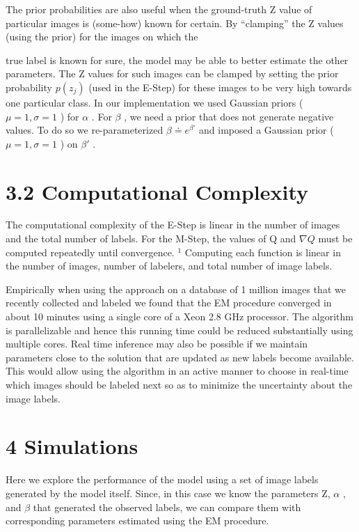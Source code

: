 \documentclass[
]{article}
\begin{document}
The prior probabilities are also useful when the ground-truth Z value of
particular images is (some-how) known for certain. By ``clamping'' the Z
values (using the prior) for the images on which the

true label is known for sure, the model may be able to better estimate
the other parameters. The Z values for such images can be clamped by
setting the prior probability \(p(z_{j})\) (used in the E-Step) for
these images to be very high towards one particular class. In our
implementation we used Gaussian priors ( \(\mu = 1, \sigma = 1\) ) for
\(\alpha\) . For \(\beta\) , we need a prior that does not generate
negative values. To do so we re-parameterized
\(\beta \doteq e^{\beta'}\) and imposed a Gaussian prior (
\(\mu = 1, \sigma = 1\) ) on \(\beta'\) .

\section{3.2 Computational Complexity}\label{computational-complexity}

The computational complexity of the E-Step is linear in the number of
images and the total number of labels. For the M-Step, the values of Q
and \(\nabla Q\) must be computed repeatedly until convergence. \(^{1}\)
Computing each function is linear in the number of images, number of
labelers, and total number of image labels.

Empirically when using the approach on a database of 1 million images
that we recently collected and labeled we found that the EM procedure
converged in about 10 minutes using a single core of a Xeon 2.8 GHz
processor. The algorithm is parallelizable and hence this running time
could be reduced substantially using multiple cores. Real time inference
may also be possible if we maintain parameters close to the solution
that are updated as new labels become available. This would allow using
the algorithm in an active manner to choose in real-time which images
should be labeled next so as to minimize the uncertainty about the image
labels.

\section{4 Simulations}\label{simulations}

Here we explore the performance of the model using a set of image labels
generated by the model itself. Since, in this case we know the
parameters Z, \(\alpha\) , and \(\beta\) that generated the observed
labels, we can compare them with corresponding parameters estimated
using the EM procedure.
\end{document}
